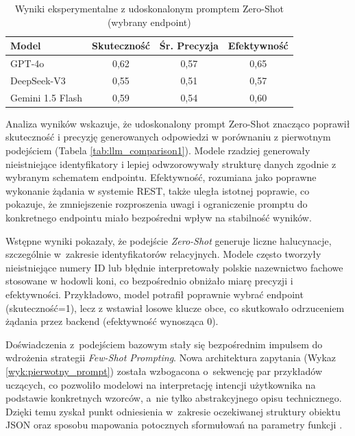 \begin{table}[h!]
\centering
\caption{Wyniki eksperymentalne z udoskonalonym promptem Zero-Shot (wybrany endpoint)}
\label{tab:llm_comparison2}
\begin{tabular}{|l|c|c|c|}
\hline
\textbf{Model} & \textbf{Skuteczność} & \textbf{Śr. Precyzja} & \textbf{Efektywność} \\ \hline
GPT-4o & 0,62 & 0,57 & 0,65 \\ \hline
DeepSeek-V3 & 0,55 & 0,51 & 0,57 \\ \hline
Gemini 1.5 Flash & 0,59 & 0,54 & 0,60 \\ \hline
\end{tabular}
\end{table}


Analiza wyników wskazuje, że udoskonalony prompt Zero-Shot znacząco poprawił skuteczność i precyzję generowanych odpowiedzi w porównaniu z pierwotnym podejściem (Tabela \ref{tab:llm_comparison1}). Modele rzadziej generowały nieistniejące identyfikatory i lepiej odwzorowywały strukturę danych zgodnie z wybranym schematem endpointu. Efektywność, rozumiana jako poprawne wykonanie żądania w systemie REST, także uległa istotnej poprawie, co pokazuje, że zmniejszenie rozproszenia uwagi i ograniczenie promptu do konkretnego endpointu miało bezpośredni wpływ na stabilność wyników.

Wstępne wyniki pokazały, że podejście \textit{Zero-Shot} generuje liczne halucynacje, szczególnie w~zakresie identyfikatorów relacyjnych. Modele często tworzyły nieistniejące numery ID lub błędnie interpretowały polskie nazewnictwo fachowe stosowane w hodowli koni, co bezpośrednio obniżało miarę precyzji i efektywności. Przykładowo, model potrafił poprawnie wybrać endpoint (skuteczność=1), lecz z wstawiał losowe klucze obce, co skutkowało odrzuceniem żądania przez backend (efektywność wynosząca 0).

Doświadczenia z~podejściem bazowym stały się bezpośrednim impulsem do wdrożenia strategii \textit{Few-Shot Prompting}. Nowa architektura zapytania (Wykaz \ref{wyk:pierwotny_prompt}) została wzbogacona o~sekwencję par przykładów uczących, co pozwoliło modelowi na interpretację intencji użytkownika na podstawie konkretnych wzorców, a~nie tylko abstrakcyjnego opisu technicznego. Dzięki temu  zyskał punkt odniesienia w~zakresie oczekiwanej struktury obiektu \textsf{JSON} oraz sposobu mapowania potocznych sformułowań na parametry funkcji .

